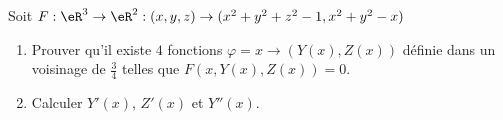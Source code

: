 
\begin{exercice}\label{exoImplicite0004}

Soit $F: \eR^3 \rightarrow  \eR^2 :  (x,y,z) \rightarrow  (x^2+y^2 +z^2 -1,
x^2+y^2-x)$
\begin{enumerate}
\item
Prouver qu'il existe $4$ fonctions $\varphi = x \rightarrow (Y(x),Z(x))$
définie dans un voisinage de $\frac{3}{4}$ telles que $F(x,Y(x),Z(x))=0$.
\item
Calculer $Y'(x)$, $Z'(x)$ et $Y''(x)$.
\end{enumerate}

\end{exercice}
